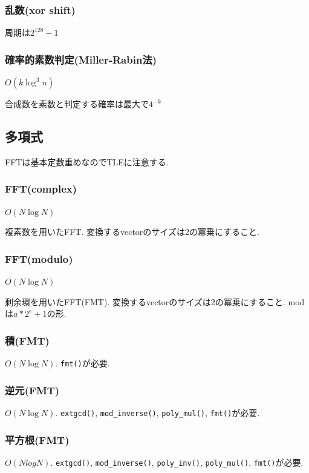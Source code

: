 \subsubsection{乱数(xor shift)}
周期は$2^{128}-1$


\subsubsection{確率的素数判定(Miller-Rabin法)}
$O(k\log^3n)$\par
合成数を素数と判定する確率は最大で$4^{-k}$\\


\subsection{多項式}
FFTは基本定数重めなのでTLEに注意する.
\subsubsection{FFT(complex)}
$O(N \log N)$\par
複素数を用いたFFT. 変換するvectorのサイズは2の冪乗にすること.


\subsubsection{FFT(modulo)}
$O(N \log N)$\par
剰余環を用いたFFT(FMT). 変換するvectorのサイズは2の冪乗にすること. modは$a*2^e+1$の形.\\


\subsubsection{積(FMT)}
$O(N \log N)$. \texttt{fmt()}が必要.


\subsubsection{逆元(FMT)}
$O(N \log N)$. \texttt{extgcd()}, \texttt{mod\_inverse()}, \texttt{poly\_mul()}, \texttt{fmt()}が必要.


\subsubsection{平方根(FMT)}
$O(N log N)$. \texttt{extgcd()}, \texttt{mod\_inverse()}, \texttt{poly\_inv()}, \texttt{poly\_mul()}, \texttt{fmt()}が必要.



